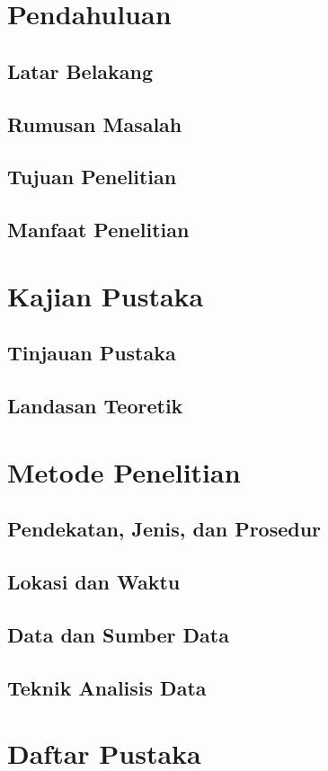 \documentclass[proposal]{unnes-ta_plus}
\begin{document}
\unnesFrontMatter

\maketitleunnes
\unnesPersetujuanPembimbing
\tableofcontents
\clearpage

\unnesMainMatter

\chapter{Pendahuluan}
\section{Latar Belakang}
\section{Rumusan Masalah}
\section{Tujuan Penelitian}
\section{Manfaat Penelitian}

\chapter{Kajian Pustaka}
\section{Tinjauan Pustaka}
\section{Landasan Teoretik}

\chapter{Metode Penelitian}
\section{Pendekatan, Jenis, dan Prosedur}
\section{Lokasi dan Waktu}
\section{Data dan Sumber Data}
\section{Teknik Analisis Data}

\chapter*{Daftar Pustaka}
\end{document}
